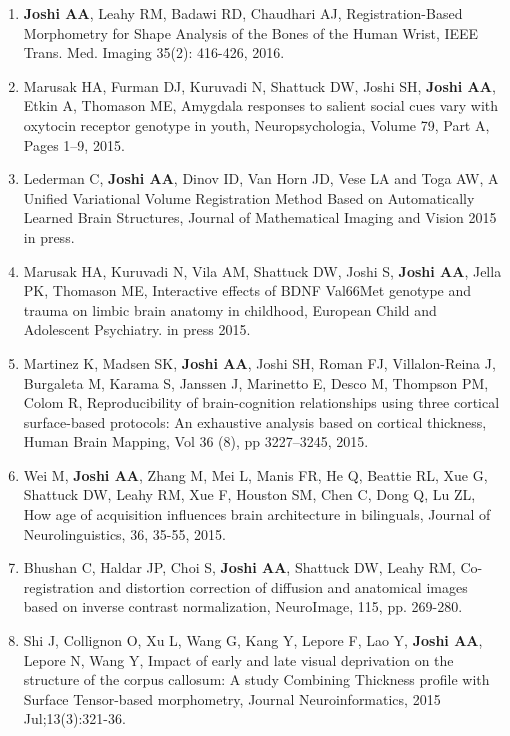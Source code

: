 \documentclass[overlapped,line,letterpaper]{res}
\begin{document}
\begin{resume}
\begin{enumerate}
    \item \textbf{Joshi AA}, Leahy RM, Badawi RD, Chaudhari AJ, {Registration-Based Morphometry for Shape Analysis of the Bones of the Human Wrist}, IEEE Trans. Med. Imaging 35(2): 416-426, 2016.

    \item Marusak HA, Furman DJ, Kuruvadi N, Shattuck DW, Joshi SH, \textbf{Joshi AA}, Etkin A, Thomason ME, {Amygdala responses to salient social cues vary with oxytocin receptor genotype in youth}, Neuropsychologia, Volume 79, Part A, Pages 1–9, 2015.

    \item Lederman C, \textbf{Joshi AA}, Dinov ID, Van Horn JD, Vese LA and Toga AW, {A Unified Variational Volume Registration Method Based on Automatically Learned Brain Structures}, Journal of Mathematical Imaging and Vision 2015 in press.

    \item Marusak HA, Kuruvadi N, Vila AM, Shattuck DW, Joshi S, \textbf{Joshi AA}, Jella PK, Thomason ME, {Interactive effects of BDNF Val66Met genotype and trauma on limbic brain anatomy in childhood}, European Child and Adolescent Psychiatry. in press 2015.

    \item Martinez K, Madsen SK, \textbf{Joshi AA}, Joshi SH, Roman FJ, Villalon-Reina J, Burgaleta M, Karama S, Janssen J, Marinetto E, Desco M, Thompson PM, Colom R, {Reproducibility of brain-cognition relationships using three cortical surface-based protocols: An exhaustive analysis based on cortical thickness}, Human Brain Mapping, Vol 36 (8), pp 3227–3245, 2015.

    \item Wei M, \textbf{Joshi AA}, Zhang M, Mei L, Manis FR, He Q, Beattie RL, Xue G, Shattuck DW, Leahy RM, Xue F, Houston SM, Chen C, Dong Q, Lu ZL, {How age of acquisition influences brain architecture in bilinguals}, Journal of Neurolinguistics, 36, 35-55, 2015. 

    \item Bhushan C, Haldar JP, Choi S, \textbf{Joshi AA}, Shattuck DW, Leahy RM, {Co-registration and distortion correction of diffusion and anatomical images based on inverse contrast normalization}, NeuroImage, 115, pp. 269-280.

    \item Shi J, Collignon O, Xu L, Wang G, Kang Y, Lepore F, Lao Y, \textbf{Joshi AA}, Lepore N, Wang Y, {Impact of early and late visual deprivation on the structure of the corpus callosum: A study Combining Thickness profile with Surface Tensor-based morphometry}, Journal Neuroinformatics, 2015 Jul;13(3):321-36.


\end{enumerate}
\end{resume}
\end{document}
